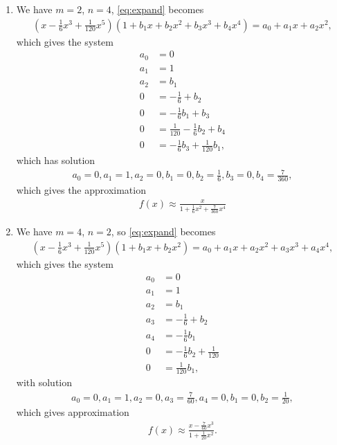 \documentclass[10pt]{article}
\begin{document}
\begin{enumerate}
\begin{enumerate}
      \item We have \(m=2\), \(n=4\), \eqref{eq:expand} becomes \begin{align*}
        \left( x - \frac{1}{6}x^3 + \frac{1}{120}x^5 \right) \left(1 + b_1x + b_2x^2 + b_3x^3 + b_4x^4\right)  = a_0 + a_1x + a_2x^2,
      \end{align*} which gives the system \begin{align*}
          a_0 &= 0 \\
          a_1 &= 1 \\
          a_2 &= b_1 \\
          0   &= -\frac{1}{6} + b_2 \\
          0   &= -\frac{1}{6}b_1 + b_3 \\
          0   &= \frac{1}{120} -\frac{1}{6}b_2 + b_4 \\
          0   &= -\frac{1}{6}b_3 + \frac{1}{120}b_1,
      \end{align*} which has solution \begin{align*}
          a_0 = 0, a_1=1, a_2=0, b_1=0, b_2=\frac{1}{6}, b_3=0, b_4=\frac{7}{360},
      \end{align*} which gives the approximation \begin{align*}
          f(x) \approx \frac{x}{1+\frac{1}{6}x^2 + \frac{7}{360}x^4}
      \end{align*}

      \item We have \(m=4\), \(n=2\), so \eqref{eq:expand} becomes \begin{align*}
        \left( x - \frac{1}{6}x^3 + \frac{1}{120}x^5 \right) \left(1 + b_1x + b_2x^2\right)  = a_0 + a_1x + a_2x^2 + a_3x^3 + a_4x^4,
      \end{align*} which gives the system \begin{align*}
          a_0 &= 0 \\
          a_1 &= 1 \\
          a_2 &= b_1 \\
          a_3 &= -\frac{1}{6} + b_2 \\
          a_4 &= -\frac{1}{6}b_1 \\
          0   &= -\frac{1}{6}b_2 + \frac{1}{120} \\
          0   &= \frac{1}{120}b_1,
      \end{align*} with solution \begin{align*}
          a_0 = 0, a_1=1, a_2=0, a_3=\frac{7}{60}, a_4=0, b_1=0, b_2=\frac{1}{20},
      \end{align*} which gives approximation \begin{align*}
          f(x) \approx \frac{x-\frac{7}{60}x^3}{1+\frac{1}{20}x^2}.
      \end{align*}


\end{enumerate}
\end{enumerate}
\end{document}
